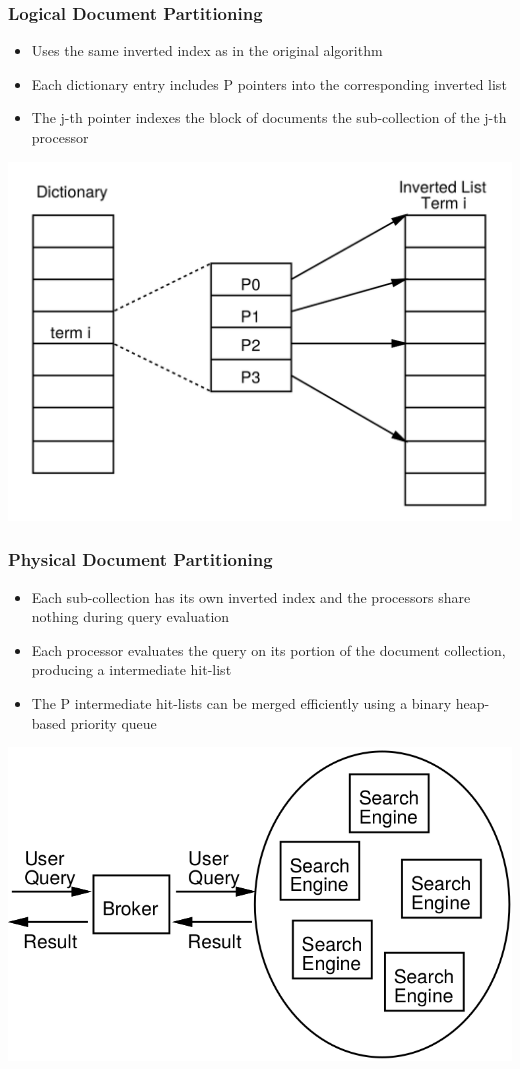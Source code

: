 \documentclass{beamer}
\begin{document}
\begin{frame}
    \frametitle{Logical Document Partitioning}
    
    \begin{itemize}
    \item Uses the same inverted index as in the original algorithm
    \item Each dictionary entry includes P pointers into the corresponding
        inverted list
    \item The j-th pointer indexes the block of documents the sub-collection of
        the j-th processor
    \end{itemize}

    \centering
    \includegraphics[width=.7\textwidth]{logicalpartitioning}
\end{frame}

\begin{frame}
    \frametitle{Physical Document Partitioning}
    \begin{itemize}
    \item Each sub-collection has its own inverted index and the processors
        share nothing during query evaluation
    \item Each processor evaluates the query on its portion of the document
        collection, producing a intermediate hit-list
    \item The P intermediate hit-lists can be merged efficiently using a binary
        heap-based priority queue
    \end{itemize}

    \centering
    \includegraphics[width=.7\textwidth]{broker}
\end{frame}
\end{document}
